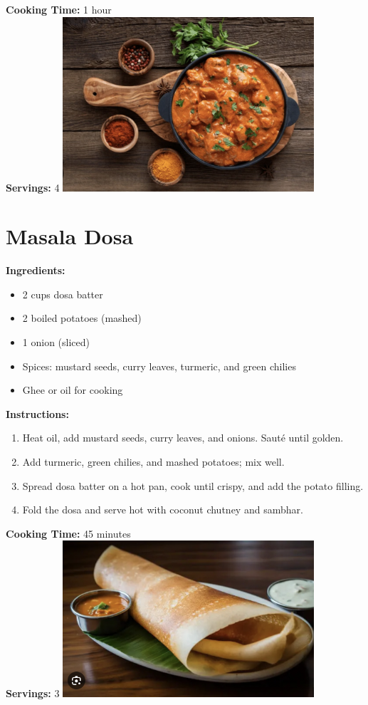 \documentclass[12pt]{article}
\begin{document}
\textbf{Cooking Time:} 1 hour \\
\textbf{Servings:} 4
\includegraphics[width=0.7\textwidth]{butter_chicken.png} 
\newpage

\section{Masala Dosa}
\label{sec:masala_dosa}
\textbf{Ingredients:}
\begin{itemize}
    \item 2 cups dosa batter
    \item 2 boiled potatoes (mashed)
    \item 1 onion (sliced)
    \item Spices: mustard seeds, curry leaves, turmeric, and green chilies
    \item Ghee or oil for cooking
\end{itemize}

\textbf{Instructions:}
\begin{enumerate}
    \item Heat oil, add mustard seeds, curry leaves, and onions. Sauté until golden.
    \item Add turmeric, green chilies, and mashed potatoes; mix well.
    \item Spread dosa batter on a hot pan, cook until crispy, and add the potato filling.
    \item Fold the dosa and serve hot with coconut chutney and sambhar.
\end{enumerate}

\textbf{Cooking Time:} 45 minutes \\
\textbf{Servings:} 3
\includegraphics[width=0.7\textwidth]{masala_dosa.png} 
\newpage
\end{document}
